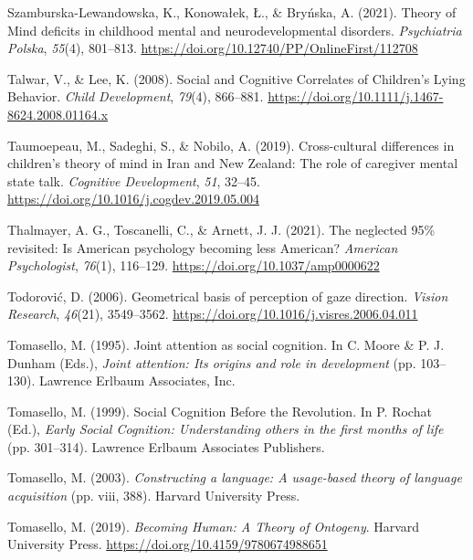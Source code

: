 \documentclass[
]{scrbook}
\newlength{\cslhangindent}
\newenvironment{CSLReferences}[2] %
 {\begin{list}{}{%
  \setlength{\itemindent}{0pt}
  \setlength{\leftmargin}{0pt}
  \setlength{\parsep}{0pt}
  \ifodd #1
   \setlength{\leftmargin}{\cslhangindent}
   \setlength{\itemindent}{-1\cslhangindent}
  \fi
  \setlength{\itemsep}{#2\baselineskip}}}
 {\end{list}}
\begin{document}
\begin{CSLReferences}{1}{0}
Szamburska-Lewandowska, K., Konowałek, Ł., \& Bryńska, A. (2021). Theory of {Mind} deficits in childhood mental and neurodevelopmental disorders. \emph{Psychiatria Polska}, \emph{55}(4), 801--813. \url{https://doi.org/10.12740/PP/OnlineFirst/112708}

Talwar, V., \& Lee, K. (2008). Social and {Cognitive Correlates} of {Children}'s {Lying Behavior}. \emph{Child Development}, \emph{79}(4), 866--881. \url{https://doi.org/10.1111/j.1467-8624.2008.01164.x}

Taumoepeau, M., Sadeghi, S., \& Nobilo, A. (2019). Cross-cultural differences in children's theory of mind in {Iran} and {New Zealand}: {The} role of caregiver mental state talk. \emph{Cognitive Development}, \emph{51}, 32--45. \url{https://doi.org/10.1016/j.cogdev.2019.05.004}

Thalmayer, A. G., Toscanelli, C., \& Arnett, J. J. (2021). The neglected 95\% revisited: {Is American} psychology becoming less {American}? \emph{American Psychologist}, \emph{76}(1), 116--129. \url{https://doi.org/10.1037/amp0000622}

Todorović, D. (2006). Geometrical basis of perception of gaze direction. \emph{Vision Research}, \emph{46}(21), 3549--3562. \url{https://doi.org/10.1016/j.visres.2006.04.011}

Tomasello, M. (1995). Joint attention as social cognition. In C. Moore \& P. J. Dunham (Eds.), \emph{Joint attention: {Its} origins and role in development} (pp. 103--130). Lawrence Erlbaum Associates, Inc.

Tomasello, M. (1999). Social {Cognition Before} the {Revolution}. In P. Rochat (Ed.), \emph{Early {Social Cognition}: {Understanding} others in the first months of life} (pp. 301--314). Lawrence Erlbaum Associates Publishers.

Tomasello, M. (2003). \emph{Constructing a language: {A} usage-based theory of language acquisition} (pp. viii, 388). Harvard University Press.

Tomasello, M. (2019). \emph{Becoming {Human}: {A Theory} of {Ontogeny}}. Harvard University Press. \url{https://doi.org/10.4159/9780674988651}


\end{CSLReferences}
\end{document}
